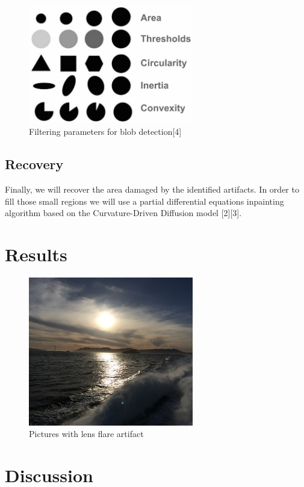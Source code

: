 \documentclass[10pt,twocolumn]{article}
\begin{document}
\begin{figure}[ht!]
\centering
\includegraphics[width=72mm]{Filters.jpg}
\caption{Filtering parameters for blob detection[4]}
\end{figure}

\subsection{Recovery}
Finally, we will recover the area damaged by the identified artifacts. In order to fill those small regions we will use a partial differential equations inpainting algorithm based on the Curvature-Driven Diffusion model [2][3].

\section{Results}

\lipsum[1]

\begin{figure}[ht!]
\centering
\includegraphics[width=72mm]{../Matlab/Images/1.jpg}
\caption{Pictures with lens flare artifact}
\end{figure}

\section{Discussion}
\end{document}
